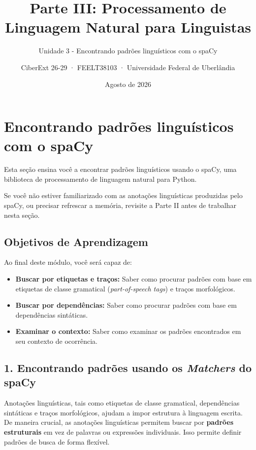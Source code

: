 \documentclass[
  brazilian,
]{article}
\title{Parte III: Processamento de Linguagem Natural para Linguistas}
\subtitle{Unidade 3 - Encontrando padrões linguísticos com o spaCy}
\author{CiberExt 26-29 · FEELT38103 · Universidade Federal de
Uberlândia}
\date{Agosto de 2026}
\providecommand{\tightlist}{%
  \setlength{\itemsep}{0pt}\setlength{\parskip}{0pt}}
\begin{document}
\maketitle

\hypertarget{encontrando-padruxf5es-linguuxedsticos-com-o-spacy}{%
\section{Encontrando padrões linguísticos com o
spaCy}\label{encontrando-padruxf5es-linguuxedsticos-com-o-spacy}}

Esta seção ensina você a encontrar padrões linguísticos usando o spaCy,
uma biblioteca de processamento de linguagem natural para Python.

Se você não estiver familiarizado com as anotações linguísticas
produzidas pelo spaCy, ou precisar refrescar a memória, revisite a Parte
II antes de trabalhar nesta seção.

\hypertarget{objetivos-de-aprendizagem}{%
\subsection{Objetivos de Aprendizagem}\label{objetivos-de-aprendizagem}}

Ao final deste módulo, você será capaz de:

\begin{itemize}
\tightlist
\item
  \textbf{Buscar por etiquetas e traços:} Saber como procurar padrões
  com base em etiquetas de classe gramatical (\emph{part-of-speech
  tags}) e traços morfológicos.
\item
  \textbf{Buscar por dependências:} Saber como procurar padrões com base
  em dependências sintáticas.
\item
  \textbf{Examinar o contexto:} Saber como examinar os padrões
  encontrados em seu contexto de ocorrência.
\end{itemize}

\hypertarget{encontrando-padruxf5es-usando-os-matchers-do-spacy}{%
\subsection{\texorpdfstring{1. Encontrando padrões usando os
\emph{Matchers} do
spaCy}{1. Encontrando padrões usando os Matchers do spaCy}}\label{encontrando-padruxf5es-usando-os-matchers-do-spacy}}

Anotações linguísticas, tais como etiquetas de classe gramatical,
dependências sintáticas e traços morfológicos, ajudam a impor estrutura
à linguagem escrita. De maneira crucial, as anotações linguísticas
permitem buscar por \textbf{padrões estruturais} em vez de palavras ou
expressões individuais. Isso permite definir padrões de busca de forma
flexível.
\end{document}
